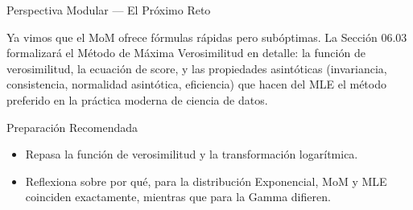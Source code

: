 \documentclass[10pt, aspectratio=169]{beamer}
\begin{document}
\begin{frame}{Perspectiva Modular --- El Próximo Reto}
  \scriptsize
  \begin{retoclase}
    Ya vimos que el MoM ofrece fórmulas rápidas pero subóptimas. La Sección 06.03 formalizará el Método de Máxima Verosimilitud en detalle: la función de verosimilitud, la ecuación de score, y las propiedades asintóticas (invariancia, consistencia, normalidad asintótica, eficiencia) que hacen del MLE el método preferido en la práctica moderna de ciencia de datos.
  \end{retoclase}

  \vspace{0.08cm}
  \pause
  \begin{alertblock}{Preparación Recomendada}
    \begin{itemize}\itemsep=0.06cm
      \item Repasa la función de verosimilitud y la transformación logarítmica.
      \item Reflexiona sobre por qué, para la distribución Exponencial, MoM y MLE coinciden exactamente, mientras que para la Gamma difieren.
    \end{itemize}
  \end{alertblock}
\end{frame}
\end{document}
